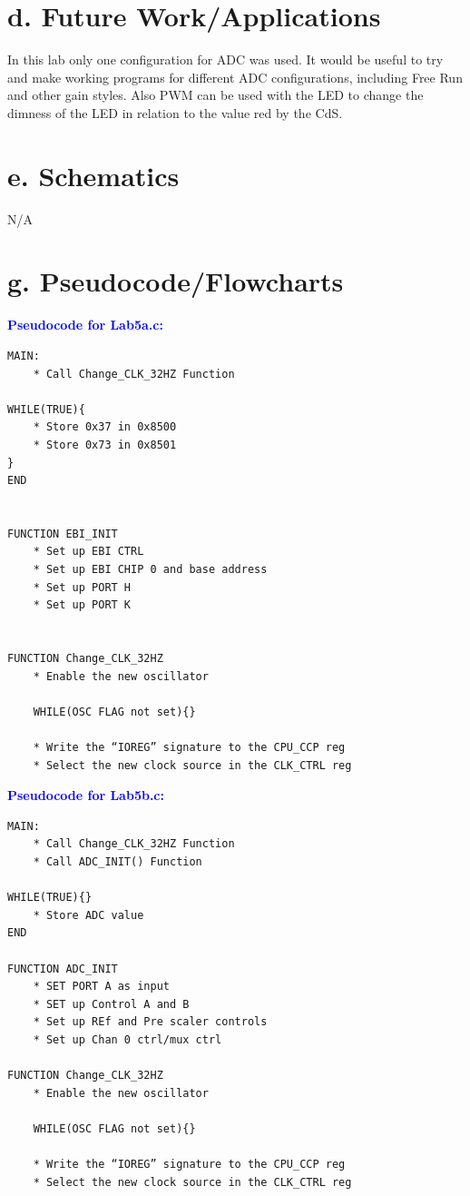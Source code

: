 \documentclass[11pt]{article}
\theoremstyle{plain}
\theoremstyle{definition}
\begin{document}
\section*{d. Future Work/Applications}
In this lab only one configuration for ADC was used. It would be useful to try and make working programs for different ADC configurations, including Free Run and other gain styles. Also PWM can be used with the LED to change the dimness of the LED in relation to the value red by the CdS.
%
%
\section*{e. Schematics}
N/A
%
%
\newpage
\section*{g. Pseudocode/Flowcharts}
%
%
\textbf{\textcolor{blue}{Pseudocode for Lab5a.c:}}
\begin{tcolorbox}
\begin{verbatim}
MAIN:
    * Call Change_CLK_32HZ Function
    
WHILE(TRUE){
	* Store 0x37 in 0x8500
	* Store 0x73 in 0x8501
}
END


FUNCTION EBI_INIT
    * Set up EBI CTRL
    * Set up EBI CHIP 0 and base address 
    * Set up PORT H
    * Set up PORT K


FUNCTION Change_CLK_32HZ
    * Enable the new oscillator

    WHILE(OSC FLAG not set){}

    * Write the “IOREG” signature to the CPU_CCP reg
    * Select the new clock source in the CLK_CTRL reg
\end{verbatim}
\end{tcolorbox}
%
%
\newpage
\textbf{\textcolor{blue}{Pseudocode for Lab5b.c:}}
\begin{tcolorbox}
\begin{verbatim}
MAIN:
    * Call Change_CLK_32HZ Function
    * Call ADC_INIT() Function
	
WHILE(TRUE){}
    * Store ADC value
END

FUNCTION ADC_INIT
    * SET PORT A as input
    * SET up Control A and B
    * Set up REf and Pre scaler controls
    * Set up Chan 0 ctrl/mux ctrl

FUNCTION Change_CLK_32HZ
    * Enable the new oscillator

    WHILE(OSC FLAG not set){}

    * Write the “IOREG” signature to the CPU_CCP reg
    * Select the new clock source in the CLK_CTRL reg
\end{verbatim}
\end{tcolorbox}	
\end{document}
